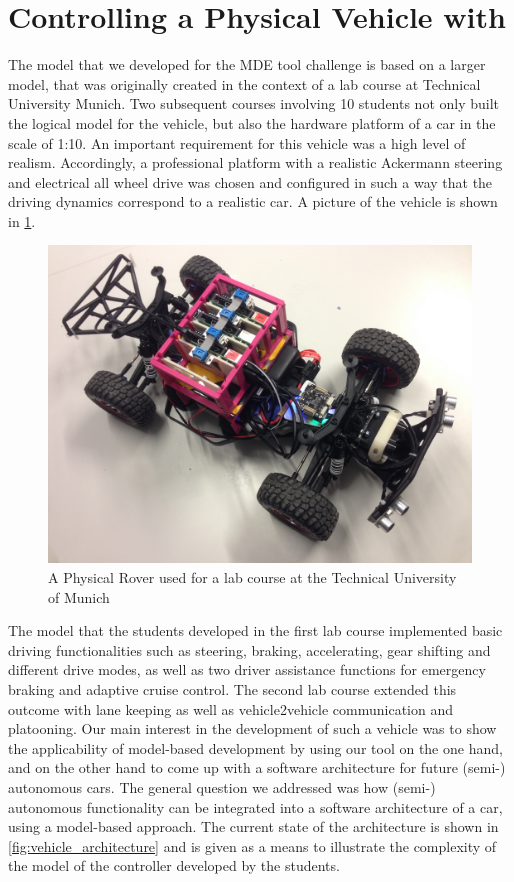 \section{Controlling a Physical Vehicle with \autofocus}
\label{sec:toy_rover_controller}

The model that we developed for the MDE tool challenge is based on a larger
model, that was originally created in the context of a lab course at Technical
University Munich. Two subsequent courses involving 10 students not only built
the logical model for the vehicle, but also the hardware platform of a car in
the scale of 1:10.
An important requirement for this vehicle was a high level of realism. Accordingly,
a professional platform with a realistic Ackermann steering and electrical all
wheel drive was chosen and configured in such a way that the driving
dynamics correspond to a realistic car. A picture of the vehicle is shown in
\fig\ref{fig:vehicle}.

\begin{figure}[!h]
\centering
\includegraphics[width=1\textwidth]{images/FullSizeRender.jpg}
\caption{A Physical Rover used for a lab course at the Technical University
of Munich}
\label{fig:vehicle}
\end{figure}

The model that the students developed in the first lab course implemented basic
driving functionalities such as steering, braking, accelerating, gear shifting
and different drive modes, as well as two driver assistance functions for
emergency braking and adaptive cruise control.
The second lab course extended this outcome with lane keeping as well as
vehicle2vehicle communication and platooning.
Our main interest in the development of such a vehicle was to show the
applicability of model-based development by using our tool \autofocus on the one
hand, and on the other hand to come up with a software architecture for future
(semi-) autonomous cars. The general question we addressed was
how (semi-) autonomous functionality can be integrated into a software
architecture of a car, using a model-based approach. The current state of the
architecture is shown in \fig\ref{fig:vehicle_architecture} and is given as a
means to illustrate the complexity of the model of the controller developed by
the students.

